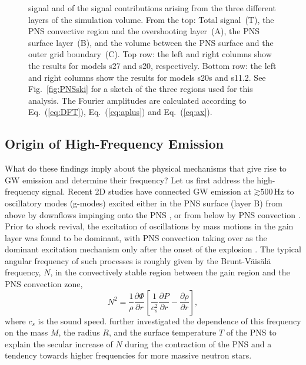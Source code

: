 \begin{figure}
{  signal and of the signal contributions arising from the three different
  layers of the simulation volume.  
  From the top: Total signal~(T), 
  the PNS convective region and the overshooting layer~(A), the PNS surface layer~(B),
  and the volume between the PNS surface and the outer grid boundary~(C).  
  Top row: the left and right columns show the
  results for models s27 and s20,
  respectively. Bottom row: the left and right columns show the
  results for models s20s and s11.2.
  See Fig.~\ref{fig:PNSski} for a sketch of the three
  regions used for this analysis. The Fourier amplitudes are calculated according to
  Eq.~(\ref{eq:DFT}), Eq.~(\ref{eq:aplus}) and Eq.~(\ref{eq:ax}). 
\label{fig:cuts}}
\end{figure}

\subsection{Origin of High-Frequency Emission}
What do these findings imply about the physical mechanisms that give
rise to GW emission and determine their frequency? Let us first
address the high-frequency signal. Recent 2D studies have connected GW
emission at $\mathord{\gtrsim} 500 \, \mathrm{Hz}$ to oscillatory modes
(g-modes) excited either in the PNS surface (layer B) from above by
downflows impinging onto the PNS
\citep{marek_08,murphy_09,mueller_13}, or from below by PNS
convection \citep{marek_08,mueller_e_12,mueller_13}. Prior to shock
revival, the excitation of oscillations by mass motions in the gain layer was found
to be dominant, with PNS convection taking over as the dominant
excitation mechanism only after the onset of the explosion \citep{mueller_e_12,mueller_13}.
The typical angular frequency of such
processes is roughly given by the Brunt-V\"{a}is\"{a}l\"{a} frequency, $N$,
in the convectively stable region between the gain region and the PNS convection zone,
\begin{equation} \label{eq:BV}
N^2 = \frac{1}{\rho} \frac{\partial \Phi}{\partial r} \left [ \frac{1}{c_s^2} \frac{\partial P}{\partial r} - \frac{\partial \rho}{\partial r} \right ],
\end{equation}
where $c_s$ is the sound speed. \citet{mueller_13} further investigated the dependence
of this frequency on the mass $M$, the radius $R$, and the surface temperature $T$ of the PNS to explain the secular
increase of $N$ during the contraction of the PNS and
a tendency towards higher frequencies for more massive neutron stars.


